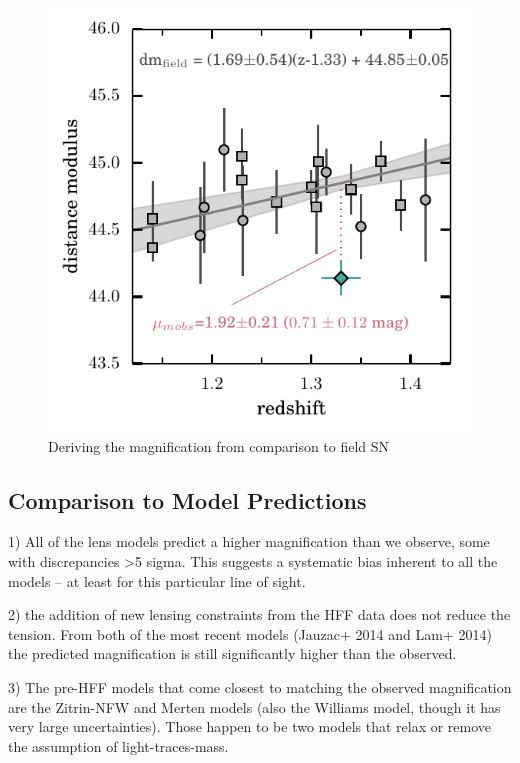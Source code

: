 \begin{figure}
\begin{center}
\includegraphics[width=\columnwidth]{FIG/magnification_measurement}
\caption{ Deriving the magnification from comparison to field SN
\label{fig:magmeasure} }
\end{center}
\end{figure}

\subsection{Comparison to Model Predictions}
\label{sec:ComparisonToModelPredictions}


1) All of the lens models predict a higher magnification than we observe, some with discrepancies >5 sigma.  This suggests a systematic bias inherent to all the models -- at least for this particular line of sight. 

2) the addition of new lensing constraints from the HFF data does not reduce the tension.  From both of the most recent models (Jauzac+ 2014 and Lam+ 2014) the predicted magnification is still significantly higher than the observed. 

3) The pre-HFF models that come closest to matching the observed magnification are the Zitrin-NFW and Merten models (also the Williams model, though it has very large uncertainties).  Those happen to be two models that relax or remove the assumption of light-traces-mass.  


